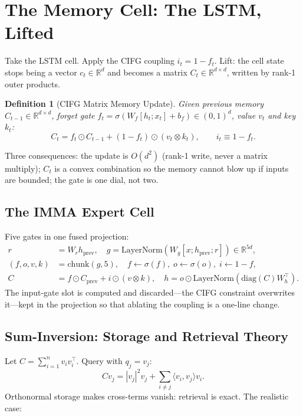\documentclass[11pt,letterpaper]{article}
\newtheorem{definition}[theorem]{Definition}
\begin{document}
\section{The Memory Cell: The LSTM, Lifted}
\label{sec:memory}

Take the LSTM cell.  Apply the CIFG coupling $i_t = 1-f_t$.  Lift: the cell
state stops being a vector $c_t \in \mathbb{R}^d$ and becomes a matrix
$C_t \in \mathbb{R}^{d \times d}$, written by rank-1 outer products.

\begin{definition}[CIFG Matrix Memory Update]
Given previous memory $C_{t-1} \in \mathbb{R}^{d \times d}$, forget gate
$f_t = \sigma(W_f [h_t; x_t] + b_f) \in (0,1)^d$, value $v_t$ and key $k_t$:
\[
\boxed{C_t = f_t \odot C_{t-1} + (1-f_t) \odot (v_t \otimes k_t),
\qquad i_t \equiv 1-f_t.}
\]
\end{definition}

Three consequences: the update is $O(d^2)$ (rank-1 write, never a matrix
multiply); $C_t$ is a convex combination so the memory cannot blow up if
inputs are bounded; the gate is one dial, not two.

\subsection{The IMMA Expert Cell}

Five gates in one fused projection:
\begin{align*}
r &= W_r h_{\text{prev}}, \quad
g = \mathrm{LayerNorm}(W_g [x; h_{\text{prev}}; r]) \in \mathbb{R}^{5d}, \\
(f, o, v, k) &= \mathrm{chunk}(g, 5), \quad
f \leftarrow \sigma(f),\; o \leftarrow \sigma(o),\; i \leftarrow 1-f, \\
C &= f \odot C_{\text{prev}} + i \odot (v \otimes k), \quad
h = o \odot \mathrm{LayerNorm}\!\left(\mathrm{diag}(C) W_h^\top\right).
\end{align*}
The input-gate slot is computed and discarded---the CIFG constraint overwrites
it---kept in the projection so that ablating the coupling is a one-line change.

\subsection{Sum-Inversion: Storage and Retrieval Theory}

Let $C = \sum_{i=1}^n v_i v_i^\top$.  Query with $q_j = v_j$:
\[
C v_j = |v_j|^2 v_j + \sum_{i \neq j} \langle v_i, v_j \rangle v_i.
\]
Orthonormal storage makes cross-terms vanish: retrieval is exact.  The
realistic case:
\end{document}
